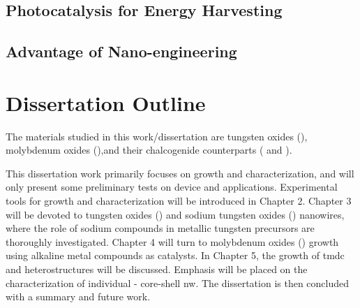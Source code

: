 \subsection{Photocatalysis for Energy Harvesting}



\subsection{Advantage of Nano-engineering}



\section{Dissertation Outline}

The materials studied in this work/dissertation are tungsten oxides (), molybdenum oxides (),and their chalcogenide counterparts ( and ). 

This dissertation work primarily focuses on growth and characterization, and will only present some preliminary tests on device and applications. Experimental tools for growth and characterization will be introduced in Chapter 2. Chapter 3 will be devoted to tungsten oxides () and sodium tungsten oxides () nanowires, where the role of sodium compounds in metallic tungsten precursors are thoroughly investigated. Chapter 4 will turn to molybdenum oxides () growth using alkaline metal compounds as catalysts. In Chapter 5, the growth of \gls{tmdc} and heterostructures will be discussed. Emphasis will be placed on the characterization of individual - core-shell \gls{nw}. The dissertation is then concluded with a summary and future work. 


